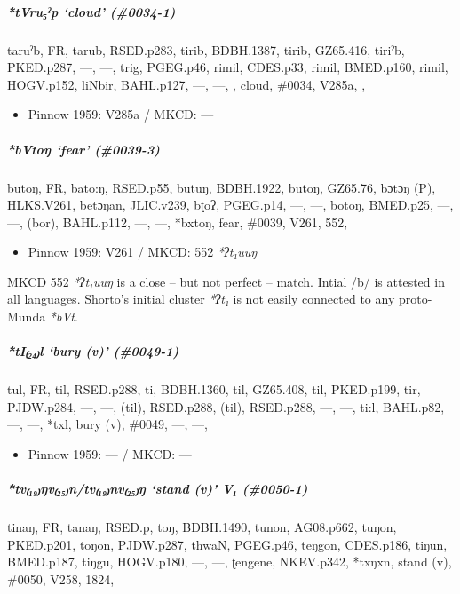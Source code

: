 \documentclass[a4paper,]{article}
\providecommand{\tightlist}{%
  \setlength{\itemsep}{0pt}\setlength{\parskip}{0pt}}
\let\oldsubparagraph\subparagraph
\renewcommand{\subparagraph}[1]{\oldsubparagraph{#1}\mbox{}}
\begin{document}
\subparagraph{\texorpdfstring{\emph{*tVru₅ˀp} `cloud'
(\#0034-1)}{*tVru₅ˀp cloud (\#0034-1)}}\label{tvruux2c0p-cloud-0034-1}

taruˀb, FR, tarub, RSED.p283, tirib, BDBH.1387, tirib, GZ65.416, tiriˀb,
PKED.p287, ---, ---, trig, PGEG.p46, rimil, CDES.p33, rimil, BMED.p160,
rimil, HOGV.p152, liNbir, BAHL.p127, ---, ---, , cloud, \#0034, V285a, ,

\begin{itemize}
\tightlist
\item
  Pinnow 1959: V285a / MKCD: ---
\end{itemize}

\subparagraph{\texorpdfstring{\emph{*bVtoŋ} `fear'
(\#0039-3)}{*bVtoŋ fear (\#0039-3)}}\label{bvtoux14b-fear-0039-3}

butoŋ, FR, bato:ŋ, RSED.p55, butuŋ, BDBH.1922, butoŋ, GZ65.76, bɔtɔŋ
(P), HLKS.V261, betɔŋan, JLIC.v239, bʈoʔ, PGEG.p14, ---, ---, botoŋ,
BMED.p25, ---, ---, (bor), BAHL.p112, ---, ---, *bxtoŋ, fear, \#0039,
V261, 552,

\begin{itemize}
\tightlist
\item
  Pinnow 1959: V261 / MKCD: 552 \emph{*ʔt₁uuŋ}
\end{itemize}

MKCD 552 \emph{*ʔt₁uuŋ} is a close -- but not perfect -- match. Intial
/b/ is attested in all languages. Shorto's initial cluster \emph{*ʔt₁}
is not easily connected to any proto-Munda \emph{*bVt}.

\subparagraph{\texorpdfstring{\emph{*tI₍₂₄₎l} `bury (v)'
(\#0049-1)}{*tI₍₂₄₎l bury (v) (\#0049-1)}}\label{til-bury-v-0049-1}

tul, FR, til, RSED.p288, ti, BDBH.1360, til, GZ65.408, til, PKED.p199,
tir, PJDW.p284, ---, ---, (til), RSED.p288, (til), RSED.p288, ---, ---,
ti:l, BAHL.p82, ---, ---, *txl, bury (v), \#0049, ---, ---,

\begin{itemize}
\tightlist
\item
  Pinnow 1959: --- / MKCD: ---
\end{itemize}

\subparagraph{\texorpdfstring{\emph{*tv₍₁₉₎ŋv₍₂₅₎n/tv₍₁₉₎nv₍₂₅₎ŋ} `stand
(v)' V₁
(\#0050-1)}{*tv₍₁₉₎ŋv₍₂₅₎n/tv₍₁₉₎nv₍₂₅₎ŋ stand (v) V₁ (\#0050-1)}}\label{tvux14bvntvnvux14b-stand-v-v-0050-1}

tinaŋ, FR, tanaŋ, RSED.p, toŋ, BDBH.1490, tunon, AG08.p662, tuŋon,
PKED.p201, toŋon, PJDW.p287, thwaN, PGEG.p46, teŋgon, CDES.p186, tiŋun,
BMED.p187, tiŋgu, HOGV.p180, ---, ---, ʈengene, NKEV.p342, *txŋxn, stand
(v), \#0050, V258, 1824,
\end{document}
